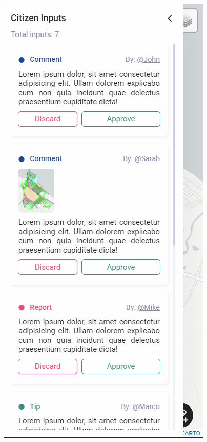 \begin{figure}[H]
\begin{minipage}{0.24\textwidth}
    \end{minipage}
    \hfill
    \begin{minipage}{0.24\textwidth}
        \centering
        \includegraphics[width=\textwidth]{res/web/mobile-see-notes}

\end{minipage}
\end{figure}
